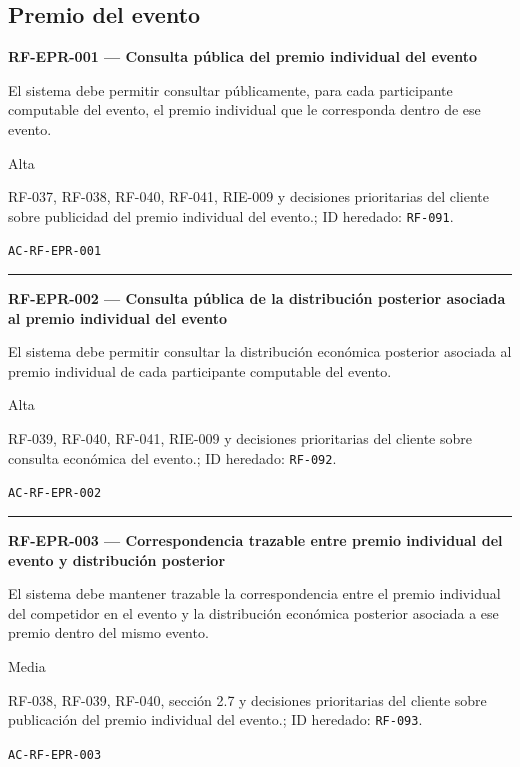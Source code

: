 \documentclass[10pt,letterpaper]{article}
\begin{document}
\subsection{Premio del evento}
\noindent\textbf{RF-EPR-001 --- Consulta pública del premio individual del evento}\par
\begin{description}[style=nextline,leftmargin=3.15cm,labelwidth=2.8cm,font=\normalfont\bfseries]
\item[Obligación] El sistema debe permitir consultar públicamente, para cada participante computable del evento, el premio individual que le corresponda dentro de ese evento.
\item[Prioridad] Alta
\item[Procedencia] RF-037, RF-038, RF-040, RF-041, RIE-009 y decisiones prioritarias del cliente sobre publicidad del premio individual del evento.; ID heredado: \texttt{RF-091}.
\item[Verificación] \texttt{AC-RF-EPR-001}
\end{description}
\vspace{0.25em}\hrule\vspace{0.65em}
\noindent\textbf{RF-EPR-002 --- Consulta pública de la distribución posterior asociada al premio individual del evento}\par
\begin{description}[style=nextline,leftmargin=3.15cm,labelwidth=2.8cm,font=\normalfont\bfseries]
\item[Obligación] El sistema debe permitir consultar la distribución económica posterior asociada al premio individual de cada participante computable del evento.
\item[Prioridad] Alta
\item[Procedencia] RF-039, RF-040, RF-041, RIE-009 y decisiones prioritarias del cliente sobre consulta económica del evento.; ID heredado: \texttt{RF-092}.
\item[Verificación] \texttt{AC-RF-EPR-002}
\end{description}
\vspace{0.25em}\hrule\vspace{0.65em}
\noindent\textbf{RF-EPR-003 --- Correspondencia trazable entre premio individual del evento y distribución posterior}\par
\begin{description}[style=nextline,leftmargin=3.15cm,labelwidth=2.8cm,font=\normalfont\bfseries]
\item[Obligación] El sistema debe mantener trazable la correspondencia entre el premio individual del competidor en el evento y la distribución económica posterior asociada a ese premio dentro del mismo evento.
\item[Prioridad] Media
\item[Procedencia] RF-038, RF-039, RF-040, sección 2.7 y decisiones prioritarias del cliente sobre publicación del premio individual del evento.; ID heredado: \texttt{RF-093}.
\item[Verificación] \texttt{AC-RF-EPR-003}
\end{description}
\end{document}
